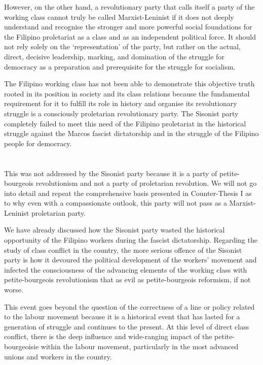 However, on the other hand, 
a revolutionary party that calls itself 
a party of the working class 
cannot truly be called Marxist-Leninist 
if it does not deeply understand and recognise 
the stronger and more powerful social foundations 
for the Filipino proletariat 
as a class and as an independent political force. 
It should not rely solely on the `representation' of the party, 
but rather on the actual, direct, decisive leadership, marking, 
and domination of the struggle for democracy 
as a preparation and prerequisite 
for the struggle for socialism.

The Filipino working class has not been able to demonstrate 
this objective truth 
rooted in its position in society 
and its class relations 
because the fundamental requirement for it to fulfill its role in history 
and organise its revolutionary struggle 
is a consciously proletarian revolutionary party. 
The Sisonist party completely failed 
to meet this need of the Filipino proletariat 
in the historical struggle against the Marcos fascist dictatorship 
and in the struggle of the Filipino people for democracy.


\section{}
This was not addressed 
by the Sisonist party 
because it is a party of petite-bourgeois revolutionism 
and not a party of proletarian revolution. 
We will not go into detail 
and repeat the comprehensive basis 
presented in Counter-Thesis I
as to why even with a compassionate outlook, 
this party will not pass as a Marxist-Leninist proletarian party.

We have already discussed 
how the Sisonist party 
wasted the historical opportunity of the Filipino workers 
during the fascist dictatorship. 
Regarding the study of class conflict in the country, 
the more serious offence of the Sisonist party 
is how it devoured the political development of the workers' movement 
and infected the consciousness of the advancing elements of the working class 
with petite-bourgeois revolutionism
that as evil as petite-bourgeois reformism,
if not worse.

This event goes beyond the question of the correctness 
of a line or policy related to the labour movement 
because it is a historical event 
that has lasted for a generation of struggle 
and continues to the present. 
At this level of direct class conflict, 
there is the deep influence and wide-ranging impact 
of the petite-bourgeoisie within the labour movement, 
particularly in the most advanced unions and workers in the country.

